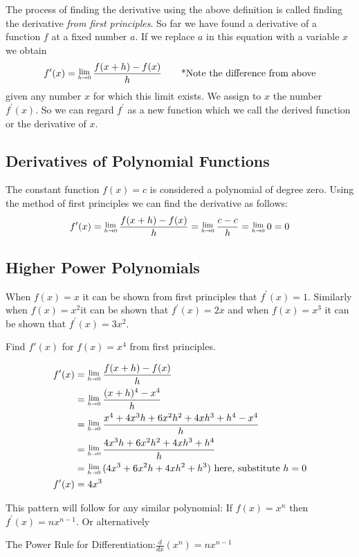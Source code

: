 The process of finding the derivative using the above definition is called finding the derivative \textit{from first principles}. So far we have found a derivative of a function $f$ at a fixed number $a$. If we replace $a$ in this equation with a variable $x$ we obtain
\[f^{ \prime } (x) =\Lim{h \to 0}\frac{f (x +h) -f (x)}{h}\tag*{*Note the difference from above}\]
given any number $x$ for which this limit exists. We assign to $x$ the number $f^{ \prime } \left (x\right )$. So we can regard $f^{ \prime }$ as a new function which we call the derived function or the derivative of $x$.

\subsection*{Derivatives of Polynomial Functions}
The constant function $f (x) =c$ is considered a polynomial of degree zero. Using the method of first principles we can find the derivative as follows:
$$f^{ \prime } (x) =\Lim{h\to 0}\frac{f (x +h) -f (x)}{h} =\Lim{h\to 0}\frac{c -c}{h} =\Lim{h\to 0}0 =0$$

\subsection*{Higher Power Polynomials}
When $f (x) =x$ it can be shown from first principles that $f^{ \prime } (x) =1$. Similarly when $f (x) =x^{2\text{}}$it can be shown that $f^{ \prime } (x) =2 x$ and when $f (x) =x^{3}$ it can be shown that $f^{ \prime } (x) =3 x^{2}$.

\example Find $f'(x)$ for $f (x) =x^{4}$ from first principles.

\solution \begin{align*}f^{ \prime } (x) &  = \Lim{h\to 0}\frac{f (x +h) -f (x)}{h} \\
 &  = \Lim{h\to 0}\frac{(x +h)^{4} -x^{4}}{h} \\
 &  = \Lim{h\to 0}\frac{x^{4} +4 x^{3} h +6 x^{2} h^{2} +4 x h^{3} +h^{4} -x^{4}}{h} \\
 &  = \Lim{h\to 0}\frac{4 x^{3} h +6 x^{2} h^{2} +4 x h^{3} +h^{4}}{h} \\
 &  = \Lim{h\to 0}(4 x^{3} +6 x^{2} h +4 x h^{2} +h^{3})\text{ here, substitute }h=0 \\
 f'(x)&  = 4 x^{3}\end{align*}

This pattern will follow for any similar polynomial: If $f (x) =x^{n}$ then $f^{ \prime } (x) =n x^{n -1}$. Or alternatively
\begin{tcolorbox}
The Power Rule for Differentiation:\qquad$\displaystyle \frac{d}{d x} (x^{n}) =n x^{n -1}$
\end{tcolorbox}

